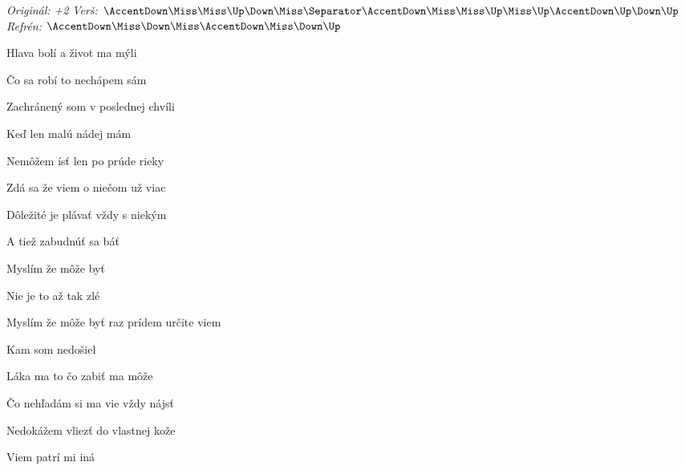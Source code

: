 \begin{song}


\begin{headerbox}
\RaiseBoxWithAccents
\textit{Originál: +2} \quad
\textit{Verš:} $\AccentDown\Miss\Miss\Up\Down\Miss \Separator \AccentDown\Miss\Miss\Up\Miss\Up\AccentDown\Up\Down\Up$ \quad
\textit{Refrén:} $\AccentDown\Miss\Down\Miss\AccentDown\Miss\Down\Up$
\end{headerbox}

\begin{hchordbox}
\end{hchordbox}

\Large

\bigskip

Hlava bolí a život ma mýli \par
{}Čo sa robí to nechápem sám \par
{}Zachránený som v poslednej chvíli \par
Keď len malú nádej mám \par

\bigskip

Nemôžem ísť len po prúde rieky \par
{}Zdá sa že viem o niečom už viac \par
{}Dôležité je plávať vždy s niekým \par
A tiež zabudnúť sa báť \par

\bigskip

\begin{chorusbox}{\Refren}
Myslím že môže byť   \par
Nie je to až tak zlé    \par
Myslím že môže byť  raz prídem určite viem \par
Kam som nedošiel \par
\end{chorusbox}

\bigskip

Láka ma to čo zabiť ma môže \par
{}Čo nehľadám si ma vie vždy nájsť \par
{}Nedokážem vliezť do vlastnej kože \par
{}Viem patrí mi iná \par


\end{song}
